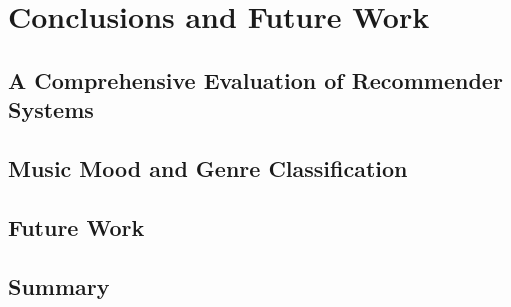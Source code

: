 \chapter{Conclusions and Future Work}\label{chap:conc}

\blindtext

 
\section{A Comprehensive Evaluation of Recommender Systems}\label{sec:key1}

 \blindtext

\section{Music Mood and Genre Classification}\label{sec:key2}



\blindtext


\section{Future Work}\label{sec:future}


\blindtext



\section{Summary}\label{sec:sum}

\blindtext
